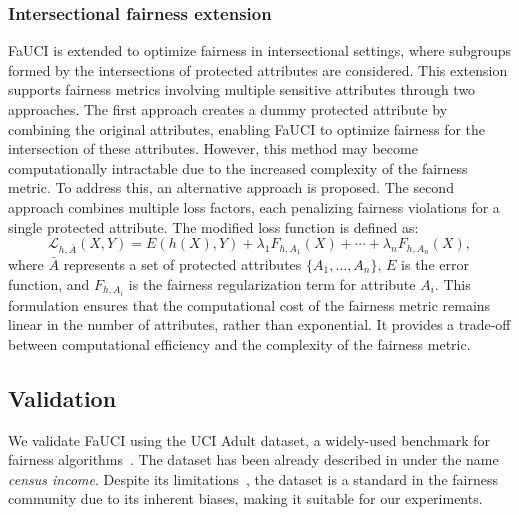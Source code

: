\subsubsection{Intersectional fairness extension}\label{subsubsec:intersectional-fairness}
%
\Gls{FaUCI} is extended to optimize fairness in intersectional settings, where subgroups formed by the intersections of protected attributes are considered.
%
This extension supports fairness metrics involving multiple sensitive attributes through two approaches.
%
The first approach creates a dummy protected attribute by combining the original attributes, enabling \gls{FaUCI} to optimize fairness for the intersection of these attributes.
%
However, this method may become computationally intractable due to the increased complexity of the fairness metric.
%
To address this, an alternative approach is proposed.
%
The second approach combines multiple loss factors, each penalizing fairness violations for a single protected attribute.
%
The modified loss function is defined as:
%
\begin{equation}
    \label{eq:intersectional_loss}
    \mathcal{L}_{h,\bar{A}}(X, Y) = E(h(X), Y) + \lambda_1 F_{h,A_1}(X) + \cdots + \lambda_n F_{h,A_n}(X),
\end{equation}
%
where \(\bar{A}\) represents a set of protected attributes \(\{A_1, \ldots, A_n\}\), \(E\) is the error function, and \(F_{h,A_i}\) is the fairness regularization term for attribute \(A_i\).
%
This formulation ensures that the computational cost of the fairness metric remains linear in the number of attributes, rather than exponential.
%
It provides a trade-off between computational efficiency and the complexity of the fairness metric.
%


\subsection{Validation}\label{subsec:validation-fauci}
%
We validate \gls{FaUCI} using the UCI Adult dataset, a widely-used benchmark for fairness algorithms~\cite{census_income_20}.
%
The dataset has been already described in  under the name \emph{census income}.
%
Despite its limitations~\cite{retiring-adult-2021}, the dataset is a standard in the fairness community due to its inherent biases, making it suitable for our experiments.

%
